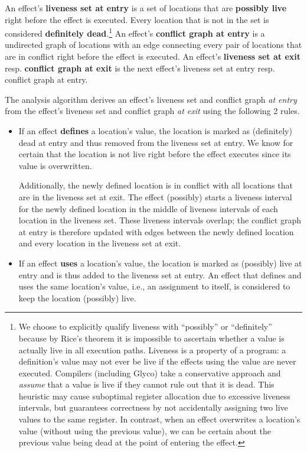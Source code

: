 \documentclass[main.tex]{subfiles}
\begin{document}
An effect's \textbf{liveness set at entry} is a set of locations that are \textbf{possibly live} right before the effect is executed. Every location that is not in the set is considered \textbf{definitely dead}.\footnote{We choose to explicitly qualify liveness with \enquote{possibly} or \enquote{definitely} because by Rice's theorem it is impossible to ascertain whether a value is actually live in all execution paths. Liveness is a property of a program: a definition's value may not ever be live if the effects using the value are never executed. Compilers (including Glyco) take a conservative approach and \emph{assume} that a value is live if they cannot rule out that it is dead. This heuristic may cause suboptimal register allocation due to excessive liveness intervals, but guarantees correctness by not accidentally assigning two live values to the same register. In contrast, when an effect overwrites a location's value (without using the previous value), we can be certain about the previous value being dead at the point of entering the effect.} An effect's \textbf{conflict graph at entry} is a undirected graph of locations with an edge connecting every pair of locations that are in conflict right before the effect is executed. An effect's \textbf{liveness set at exit} resp. \textbf{conflict graph at exit} is the next effect's liveness set at entry resp. conflict graph at entry.

The analysis algorithm derives an effect's liveness set and conflict graph \emph{at entry} from the effect's liveness set and conflict graph \emph{at exit} using the following 2 rules.

\begin{itemize}
	
	\item If an effect \textbf{defines} a location's value, the location is marked as (definitely) dead at entry and thus removed from the liveness set at entry. We know for certain that the location is not live right before the effect executes since its value is overwritten.
	
	Additionally, the newly defined location is in conflict with all locations that are in the liveness set at exit. The effect (possibly) starts a liveness interval for the newly defined location in the middle of liveness intervals of each location in the liveness set. These liveness intervals overlap; the conflict graph at entry is therefore updated with edges between the newly defined location and every location in the liveness set at exit.
	
	\item If an effect \textbf{uses} a location's value, the location is marked as (possibly) live at entry and is thus added to the liveness set at entry. An effect that defines and uses the same location's value, i.e., an assignment to itself, is considered to keep the location (possibly) live.
	
\end{itemize}
\end{document}
